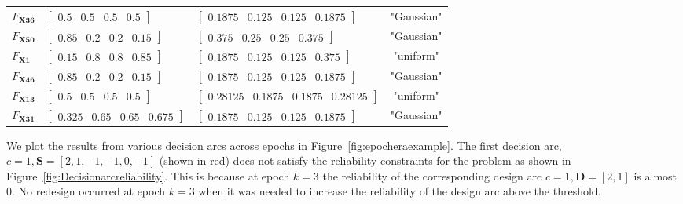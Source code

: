 \begin{table}[h!]
\begin{tabular}{l>{\centering\arraybackslash}p{4.2cm}>{\centering\arraybackslash}p{6cm}c}
	\hline
	$F_{\mathbf{X36}}$ & $\begin{bmatrix} 0.5 & 0.5 & 0.5 & 0.5 \end{bmatrix}$ & $\begin{bmatrix} 0.1875 & 0.125 & 0.125 & 0.1875 \end{bmatrix}$ & "Gaussian" \\
	$F_{\mathbf{X50}}$ & $\begin{bmatrix} 0.85 & 0.2 & 0.2 & 0.15 \end{bmatrix}$ & $\begin{bmatrix} 0.375 & 0.25 & 0.25 & 0.375 \end{bmatrix}$ & "Gaussian" \\
	$F_{\mathbf{X1}}$ & $\begin{bmatrix} 0.15 & 0.8 & 0.8 & 0.85 \end{bmatrix}$ & $\begin{bmatrix} 0.1875 & 0.125 & 0.125 & 0.375 \end{bmatrix}$ & "uniform" \\
	$F_{\mathbf{X46}}$ & $\begin{bmatrix} 0.85 & 0.2 & 0.2 & 0.15 \end{bmatrix}$ & $\begin{bmatrix} 0.1875 & 0.125 & 0.125 & 0.1875 \end{bmatrix}$ & "Gaussian" \\
	$F_{\mathbf{X13}}$ & $\begin{bmatrix} 0.5 & 0.5 & 0.5 & 0.5 \end{bmatrix}$ & $\begin{bmatrix} 0.28125 & 0.1875 & 0.1875 & 0.28125 \end{bmatrix}$ & "uniform" \\
	$F_{\mathbf{X31}}$ & $\begin{bmatrix} 0.325 & 0.65 & 0.65 & 0.675 \end{bmatrix}$ & $\begin{bmatrix} 0.1875 & 0.125 & 0.125 & 0.1875 \end{bmatrix}$ & "Gaussian" \\
	\hline\hline
	\end{tabular}
\end{table}

We plot the results from various decision arcs across epochs in Figure~\ref{fig:epocheraexample}. The first decision arc, $c=1,\mathbf{S}=\left[2,1,-1,-1,0,-1\right]$ (shown in red) does not satisfy the reliability constraints for the problem as shown in Figure~\ref{fig:Decisionarcreliability}. This is because at epoch $k=3$ the reliability of the corresponding design arc $c=1,\mathbf{D}=\left[2,1\right]$ is almost 0. No redesign occurred at epoch $k=3$ when it was needed to increase the reliability of the design arc above the threshold.

